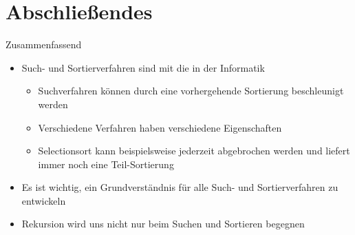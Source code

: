 \section{Abschließendes}
{\SummaryFrame
\begin{frame}[t]{Zusammenfassend}
\pause \printBibCommand
\vfill\vfill %
\begin{itemize}[<+(1)->]
    \itemsep4pt
    \item Such- und Sortierverfahren sind mit die  in der Informatik
    \begin{itemize}
        \item Suchverfahren können durch eine vorhergehende Sortierung beschleunigt werden
        \item Verschiedene Verfahren haben verschiedene Eigenschaften
        \item Selectionsort kann beispielsweise jederzeit abgebrochen werden und liefert immer noch eine Teil-Sortierung 
    \end{itemize}
    \item Es ist wichtig, ein Grundverständnis für alle Such- und Sortierverfahren zu entwickeln
    \item Rekursion wird uns nicht nur beim Suchen und Sortieren begegnen
\end{itemize}
\end{frame}
}


\iffull\fi
